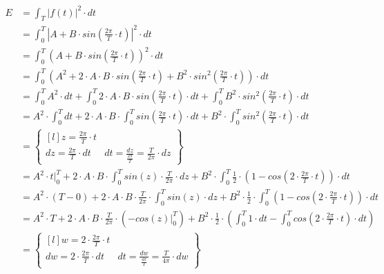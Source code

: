 \begin{task}
\begin{align*}
E&=\int_{T}^{}\left|f(t)\right|^2 \cdot dt\\
 &=\int_{0}^{T}\left|A + B \cdot sin\left(\frac{2\pi}{T}\cdot t \right) \right|^2 \cdot dt\\ 
 &=\int_{0}^{T}\left(A + B \cdot sin\left(\frac{2\pi}{T}\cdot t \right) \right)^2 \cdot dt\\ 
 &=\int_{0}^{T}\left(A^2 + 2\cdot A \cdot B \cdot sin\left(\frac{2\pi}{T}\cdot t \right) + B^2 \cdot sin^2\left(\frac{2\pi}{T}\cdot t \right) \right) \cdot dt\\
 &=\int_{0}^{T}A^2 \cdot dt + \int_{0}^{T} 2\cdot A \cdot B \cdot sin\left(\frac{2\pi}{T}\cdot t \right) \cdot dt + \int_{0}^{T} B^2 \cdot sin^2\left(\frac{2\pi}{T}\cdot t \right)  \cdot dt\\
 &=A^2 \cdot \int_{0}^{T} dt + 2\cdot A \cdot B \cdot \int_{0}^{T} sin\left(\frac{2\pi}{T}\cdot t \right) \cdot dt + B^2 \cdot \int_{0}^{T}  sin^2\left(\frac{2\pi}{T}\cdot t \right)  \cdot dt\\
 &=\begin{Bmatrix*}[l]
 z=\frac{2\pi}{T} \cdot t\\
 dz = \frac{2\pi}{T} \cdot dt & dt = \frac{dz}{\frac{2\pi}{T}} =\frac{T}{2\pi} \cdot dz 
 \end{Bmatrix*}\\
 &=A^2 \cdot \left. t \right|_{0}^{T} + 2\cdot A \cdot B \cdot \int_{0}^{T} sin\left(z \right) \cdot \frac{T}{2\pi} \cdot dz + B^2 \cdot \int_{0}^{T} \frac{1}{2} \cdot \left(1 - cos\left(2 \cdot \frac{2\pi}{T}\cdot t \right) \right)  \cdot dt\\
 &=A^2 \cdot \left( T - 0 \right) + 2\cdot A \cdot B \cdot \frac{T}{2\pi} \cdot \int_{0}^{T} sin\left(z \right) \cdot dz + B^2 \cdot \frac{1}{2} \cdot \int_{0}^{T} \left(1 - cos\left(2 \cdot \frac{2\pi}{T}\cdot t \right) \right)  \cdot dt\\
 &=A^2 \cdot T + 2\cdot A \cdot B \cdot \frac{T}{2\pi} \cdot \left( \left.-cos\left(z \right)\right|_{0}^{T}  \right) + B^2 \cdot \frac{1}{2} \cdot \left( \int_{0}^{T} 1 \cdot dt - \int_{0}^{T} cos\left(2 \cdot \frac{2\pi}{T}\cdot t \right)  \cdot dt \right)\\
 &=\begin{Bmatrix*}[l]
 w=2\cdot \frac{2\pi}{T} \cdot t\\
 dw = 2\cdot \frac{2\pi}{T} \cdot dt & dt = \frac{dw}{\frac{4\pi}{T}} =\frac{T}{4\pi} \cdot dw 

\end{Bmatrix*}
\end{align*}
\end{task}
